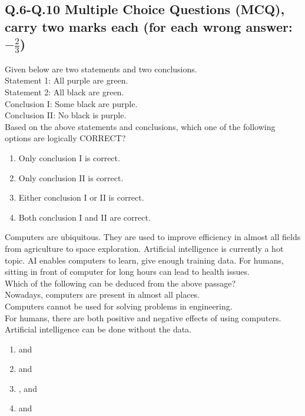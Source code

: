 \subsection*{\textbf{Q.6-Q.10 Multiple Choice Questions (MCQ), carry two marks each (for each wrong answer: \(-\frac{2}{3}\))}}
\item Given below are two statements and two conclusions.\\
 Statement 1: \;All purple are green.\\
 Statement 2: \;All black are green.\\
 Conclusion I: \;Some black are purple.\\
 Conclusion II: \;No black is purple.\\
 Based on the above statements and conclusions, which one of the following options are logically CORRECT?
\begin{enumerate}
    \item Only conclusion I is correct.
    \item Only conclusion II is correct.
    \item Either conclusion I or II is correct.
    \item Both conclusion I and II are correct.
\end{enumerate}
\item Computers are ubiquitous. They are used to improve efficiency in almost all fields from agriculture to space exploration. Artificial intelligence  is currently a hot topic. AI enables computers to learn, give enough training data. For humans, sitting in front of computer for long hours can lead to health issues.\\ Which of the following can be deduced from the above passage?\\
\;Nowadays, computers are present in almost all places.\\
\;Computers cannot be used for solving problems in engineering.\\
\;For humans, there are both positive and negative effects of using computers.\\
\;Artificial intelligence can be done without the data.
\begin{enumerate}
    \item {} and 
    \item {} and 
    \item {},  and 
    \item {} and 
\end{enumerate}

